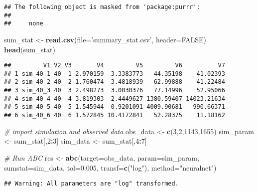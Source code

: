 \documentclass[
]{article}
\newenvironment{Shaded}{\begin{snugshade}}{\end{snugshade}}
\newcommand{\CommentTok}[1]{\textcolor[rgb]{0.56,0.35,0.01}{\textit{#1}}}
\newcommand{\DataTypeTok}[1]{\textcolor[rgb]{0.13,0.29,0.53}{#1}}
\newcommand{\DecValTok}[1]{\textcolor[rgb]{0.00,0.00,0.81}{#1}}
\newcommand{\FloatTok}[1]{\textcolor[rgb]{0.00,0.00,0.81}{#1}}
\newcommand{\KeywordTok}[1]{\textcolor[rgb]{0.13,0.29,0.53}{\textbf{#1}}}
\newcommand{\NormalTok}[1]{#1}
\newcommand{\OperatorTok}[1]{\textcolor[rgb]{0.81,0.36,0.00}{\textbf{#1}}}
\newcommand{\OtherTok}[1]{\textcolor[rgb]{0.56,0.35,0.01}{#1}}
\newcommand{\StringTok}[1]{\textcolor[rgb]{0.31,0.60,0.02}{#1}}
\begin{document}
\begin{verbatim}
## The following object is masked from 'package:purrr':
## 
##     none
\end{verbatim}

\begin{Shaded}
\begin{Highlighting}[]
\NormalTok{sum_stat <-}\StringTok{ }\KeywordTok{read.csv}\NormalTok{(}\DataTypeTok{file=}\StringTok{'summary_stat.csv'}\NormalTok{, }\DataTypeTok{header=}\OtherTok{FALSE}\NormalTok{)}
\KeywordTok{head}\NormalTok{(sum_stat)}
\end{Highlighting}
\end{Shaded}

\begin{verbatim}
##         V1 V2 V3       V4         V5         V6          V7
## 1 sim_40_1 40  1 2.970159  3.3383773   44.35198    41.02393
## 2 sim_40_2 40  2 1.760474  3.4818939   62.99888    41.22484
## 3 sim_40_3 40  3 2.498273  3.0030376   77.14996    52.95066
## 4 sim_40_4 40  4 3.819303  2.4449627 1380.59407 14023.21634
## 5 sim_40_5 40  5 1.545944  0.9201091 4009.90681   990.66371
## 6 sim_40_6 40  6 1.572845 10.4172841   52.28375    11.18162
\end{verbatim}

\begin{Shaded}
\begin{Highlighting}[]
\CommentTok{# import simulation and observed data}
\NormalTok{obs_data <-}\StringTok{ }\KeywordTok{c}\NormalTok{(}\DecValTok{3}\NormalTok{,}\DecValTok{2}\NormalTok{,}\DecValTok{1143}\NormalTok{,}\DecValTok{1655}\NormalTok{)}
\NormalTok{sim_param <-}\StringTok{ }\NormalTok{sum_stat[,}\DecValTok{2}\OperatorTok{:}\DecValTok{3}\NormalTok{]}
\NormalTok{sim_data <-}\StringTok{ }\NormalTok{sum_stat[,}\DecValTok{4}\OperatorTok{:}\DecValTok{7}\NormalTok{]}

\CommentTok{# Run ABC}
\NormalTok{res <-}\StringTok{ }\KeywordTok{abc}\NormalTok{(}\DataTypeTok{target=}\NormalTok{obs_data,}
           \DataTypeTok{param=}\NormalTok{sim_param,}
           \DataTypeTok{sumstat=}\NormalTok{sim_data,}
           \DataTypeTok{tol=}\FloatTok{0.005}\NormalTok{,}
           \DataTypeTok{transf=}\KeywordTok{c}\NormalTok{(}\StringTok{"log"}\NormalTok{),}
           \DataTypeTok{method=}\StringTok{"neuralnet"}\NormalTok{)}
\end{Highlighting}
\end{Shaded}

\begin{verbatim}
## Warning: All parameters are "log" transformed.
\end{verbatim}
\end{document}
